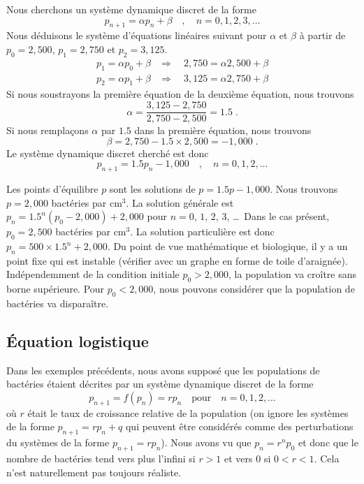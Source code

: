 {\begin{egg}
Nous cherchons un système dynamique discret de la forme
\[
p_{n+1} = \alpha p_n + \beta \quad , \quad n = 0, 1 , 2, 3, \ldots
\]
Nous déduisons le système d'équations linéaires suivant pour $\alpha$
et $\beta$ à partir de $p_0=2,500$, $p_1=2,750$ et $p_2=3,125$.
\begin{align*}
p_1 = \alpha p_0 + \beta &\Rightarrow \quad 2,750 = \alpha 2,500 + \beta \\
p_2 = \alpha p_1 + \beta &\Rightarrow \quad 3,125 = \alpha 2,750 + \beta
\end{align*}
Si nous soustrayons la première équation de la deuxième équation, nous
trouvons
\[
\alpha = \frac{3,125 - 2,750}{2,750 - 2,500} = 1.5 \; .
\]
Si nous remplaçons $\alpha$ par $1.5$ dans la première équation, nous
trouvons
\[
\beta = 2,750 - 1.5 \times 2,500 = -1,000 \; .
\]
Le système dynamique discret cherché est donc
\[
p_{n+1} = 1.5 p_n - 1,000 \quad , \quad n=0, 1, 2, \ldots
\]

Les points d'équilibre $p$ sont les solutions de $p=1.5 p - 1,000$.
Nous trouvons $p=2,000$ bactéries par cm$^3$.  La solution générale est
$p_n = 1.5^n(p_0 - 2,000) + 2,000$ pour $n=0$, $1$, $2$, $3$,
\ldots\ Dans le cas présent, $p_0 = 2,500$ bactéries par cm$^3$.
La solution particulière est donc $p_n = 500\times 1.5^n + 2,000$.  Du
point de vue mathématique et biologique, il y a un point fixe qui est
instable (vérifier avec un graphe en forme de toile d'araignée).
Indépendemment de la condition initiale $p_0 > 2,000$, la population
va croître sans borne supérieure.  Pour $p_0 <2,000$, nous pouvons
considérer que la population de bactéries va disparaître.
\end{egg}

\subsection{\'Equation logistique}

Dans les exemples précédents, nous avons supposé que les populations de
bactéries étaient décrites par un système dynamique discret de la
forme
\begin{equation} \label{sdd_modelL}
p_{n+1} = f(p_n) = r p_n  \quad \text{pour} \quad n=0,1,2,\ldots
\end{equation}
où $r$ était le taux de croissance relative de la population (on
ignore les systèmes de la forme $p_{n+1} = r p_n + q$ qui peuvent être
considérés comme des perturbations du systèmes de la forme
$p_{n+1} = r p_n$).  Nous avons vu que $p_n = r^n p_0$ et donc que le nombre
de bactéries tend vers plus l'infini si $r>1$ et vers $0$ si $0<r<1$.
Cela n'est naturellement pas toujours réaliste.

}
